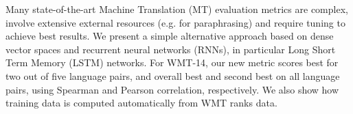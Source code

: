 Many state-of-the-art Machine Translation (MT) evaluation metrics are complex, involve extensive external resources (e.g. for paraphrasing) and require tuning to achieve best results. We present a simple alternative approach based on dense vector spaces and recurrent neural networks (RNNs), in particular Long Short Term Memory (LSTM) networks. For WMT-14, our new metric scores best for two out of five language pairs, and overall best and second best on all language pairs, using Spearman and Pearson correlation, respectively. We also show how training data is computed automatically from WMT ranks data.
